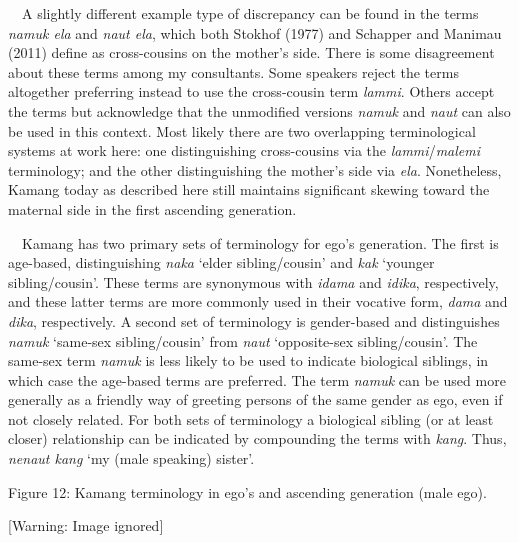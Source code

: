 \ \ A slightly different example type of discrepancy can be found in the terms \textit{namuk ela }and \textit{naut ela}, which both Stokhof (1977) and Schapper and Manimau (2011) define as cross-cousins on the mother{\textquoteright}s side. There is some disagreement about these terms among my consultants. Some speakers reject the terms altogether preferring instead to use the cross-cousin term \textit{lammi}. Others accept the terms but acknowledge that the unmodified versions \textit{namuk }and \textit{naut} can also be used in this context. Most likely there are two overlapping terminological systems at work here: one distinguishing cross-cousins via the \textit{lammi}/\textit{malemi }terminology; and the other distinguishing the mother{\textquoteright}s side via \textit{ela}. Nonetheless, Kamang today as described here still maintains significant skewing toward the maternal side in the first ascending generation. 

\ \ Kamang has two primary sets of terminology for ego{\textquoteright}s generation. The first is age-based, distinguishing \textit{naka }{\textquoteleft}elder sibling/cousin{\textquoteright} and \textit{kak }{\textquoteleft}younger sibling/cousin{\textquoteright}. These terms are synonymous with \textit{idama} and \textit{idika}, respectively, and these latter terms are more commonly used in their vocative form, \textit{dama} and \textit{dika}, respectively. A second set of terminology is gender-based and distinguishes \textit{namuk }{\textquoteleft}same-sex sibling/cousin{\textquoteright} from \textit{naut }{\textquoteleft}opposite-sex sibling/cousin{\textquoteright}. The same-sex term \textit{namuk }is less likely to be used to indicate biological siblings, in which case the age-based terms are preferred. The term \textit{namuk} can be used more generally as a friendly way of greeting persons of the same gender as ego, even if not closely related. For both sets of terminology a biological sibling (or at 
least closer) relationship can be indicated by compounding the terms with \textit{kang}. Thus, \textit{nenaut kang }{\textquoteleft}my (male speaking) sister{\textquoteright}. 

{\centering
Figure 12: Kamang terminology in ego{\textquoteright}s and ascending generation (male ego). 
\par}

  [Warning: Image ignored] %
 

